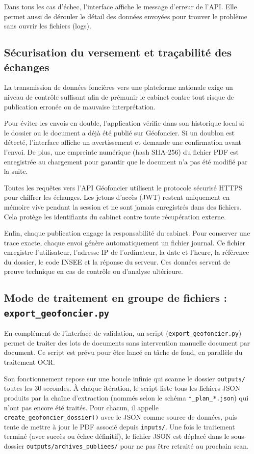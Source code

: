 Dans tous les cas d'échec, l'interface affiche le message d'erreur de l'API. Elle permet aussi de dérouler le détail des données envoyées pour trouver le problème sans ouvrir les fichiers (logs).

\subsection{Sécurisation du versement et traçabilité des échanges}

La transmission de données foncières vers une plateforme nationale exige un niveau de contrôle suffisant afin de prémunir le cabinet contre tout risque de publication erronée ou de mauvaise interprétation.

Pour éviter les envois en double, l'application vérifie dans son historique local si le dossier ou le document a déjà été publié sur Géofoncier. Si un doublon est détecté, l'interface affiche un avertissement et demande une confirmation avant l'envoi. De plus, une empreinte numérique (hash SHA-256) du fichier PDF est enregistrée au chargement pour garantir que le document n'a pas été modifié par la suite.

Toutes les requêtes vers l'API Géofoncier utilisent le protocole sécurisé HTTPS pour chiffrer les échanges. Les jetons d'accès (JWT) restent uniquement en mémoire vive pendant la session et ne sont jamais enregistrés dans des fichiers. Cela protège les identifiants du cabinet contre toute récupération externe.

Enfin, chaque publication engage la responsabilité du cabinet. Pour conserver une trace exacte, chaque envoi génère automatiquement un fichier journal. Ce fichier enregistre l'utilisateur, l'adresse IP de l'ordinateur, la date et l'heure, la référence du dossier, le code INSEE et la réponse du serveur. Ces données servent de preuve technique en cas de contrôle ou d'analyse ultérieure.

\subsection{Mode de traitement en groupe de fichiers : \texttt{export\_geofoncier.py}}

En complément de l'interface de validation, un script (\texttt{export\_geofoncier.py}) permet de traiter des lots de documents sans intervention manuelle document par document. Ce script est prévu pour être lancé en tâche de fond, en parallèle du traitement OCR.

Son fonctionnement repose sur une boucle infinie qui scanne le dossier \texttt{outputs/} toutes les 30 secondes. À chaque itération, le script liste tous les fichiers JSON produits par la chaîne d'extraction (nommés selon le schéma \texttt{*\_plan\_*.json}) qui n'ont pas encore été traités. Pour chacun, il appelle \texttt{create\_geofoncier\_dossier()} avec le JSON comme source de données, puis tente de mettre à jour le PDF associé depuis \texttt{inputs/}. Une fois le traitement terminé (avec succès ou échec définitif), le fichier JSON est déplacé dans le sous-dossier \texttt{outputs/archives\_publiees/} pour ne pas être retraité au prochain scan.

